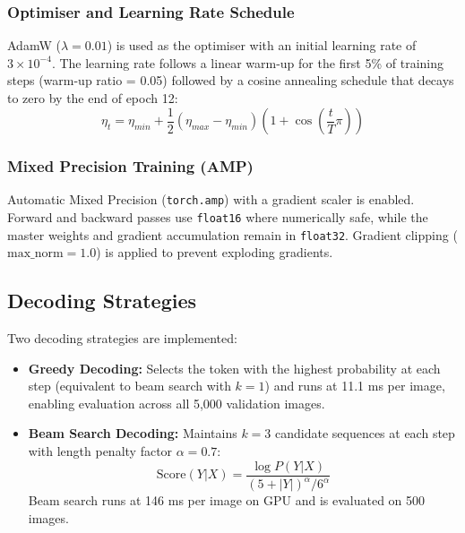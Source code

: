 \documentclass[conference]{IEEEtran}
\begin{document}
\subsubsection{Optimiser and Learning Rate Schedule}
AdamW \cite{loshchilov2017decoupled} ($\lambda = 0.01$) is used as the optimiser with an initial learning rate of $3 \times 10^{-4}$. The learning rate follows a linear warm-up for the first 5\% of training steps (warm-up ratio = 0.05) followed by a cosine annealing schedule that decays to zero by the end of epoch 12:
\begin{equation}
    \eta_t = \eta_{min} + \frac{1}{2}(\eta_{max} - \eta_{min})\left(1 + \cos\left(\frac{t}{T}\pi\right)\right)
\end{equation}

\subsubsection{Mixed Precision Training (AMP)}
Automatic Mixed Precision (\texttt{torch.amp}) with a gradient scaler is enabled. Forward and backward passes use \texttt{float16} where numerically safe, while the master weights and gradient accumulation remain in \texttt{float32}. Gradient clipping ($\text{max\_norm} = 1.0$) is applied to prevent exploding gradients.

\subsection{Decoding Strategies}
Two decoding strategies are implemented:
\begin{itemize}
    \item \textbf{Greedy Decoding:} Selects the token with the highest probability at each step (equivalent to beam search with $k=1$) and runs at 11.1 ms per image, enabling evaluation across all 5,000 validation images.
    \item \textbf{Beam Search Decoding:} Maintains $k=3$ candidate sequences at each step with length penalty factor $\alpha = 0.7$:
    \begin{equation}
        \text{Score}(Y|X) = \frac{\log P(Y|X)}{(5 + |Y|)^\alpha / 6^\alpha}
    \end{equation}
    Beam search runs at 146 ms per image on GPU and is evaluated on 500 images.
\end{itemize}

\end{document}
